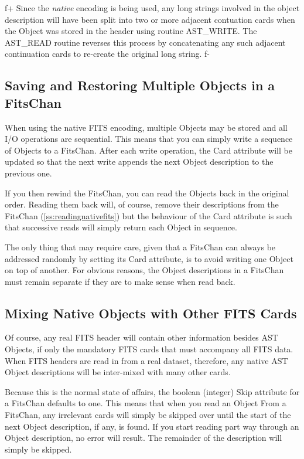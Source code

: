 \documentclass[twoside,11pt]{article}
\newcommand{\secref}[1]{\S\ref{#1}}
\renewcommand{\secref}[1]{\ref{#1}}
\begin{document}
f+
Since the {\em native} encoding is being used, any long strings involved
in the object description will have been split into two or more adjacent
contuation cards when the Object was stored in the header using routine
AST\_WRITE. The AST\_READ routine reverses this process by concatenating
any such adjacent continuation cards to re-create the original long
string.
f-

\subsection{Saving and Restoring Multiple Objects in a FitsChan}

When using the native FITS encoding, multiple Objects may be stored
and all I/O operations are sequential.  This means that you can simply
write a sequence of Objects to a FitsChan. After each write operation,
the Card attribute will be updated so that the next write appends the
next Object description to the previous one.

If you then rewind the FitsChan, you can read the Objects back in the
original order. Reading them back will, of course, remove their
descriptions from the FitsChan (\secref{ss:readingnativefits}) but the
behaviour of the Card attribute is such that successive reads will
simply return each Object in sequence.

The only thing that may require care, given that a FitsChan can always
be addressed randomly by setting its Card attribute, is to avoid
writing one Object on top of another. For obvious reasons, the Object
descriptions in a FitsChan must remain separate if they are to make
sense when read back.

\subsection{Mixing Native Objects with Other FITS Cards}

Of course, any real FITS header will contain other information besides
AST Objects, if only the mandatory FITS cards that must accompany all
FITS data. When FITS headers are read in from a real dataset,
therefore, any native AST Object descriptions will be inter-mixed with
many other cards.

Because this is the normal state of affairs, the boolean (integer)
Skip attribute for a FitsChan defaults to one. This means that when
you read an Object From a FitsChan, any irrelevant cards will simply
be skipped over until the start of the next Object description, if
any, is found. If you start reading part way through an Object
description, no error will result. The remainder of the description
will simply be skipped.
\end{document}
